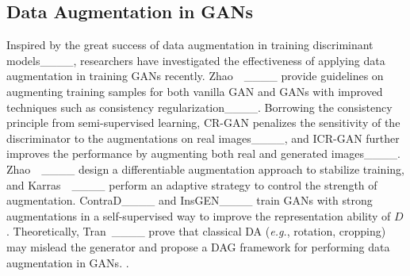 \subsection{Data Augmentation in GANs}
\label{Sec:RelatedDA}
Inspired by the great success of data augmentation in training discriminant models____, researchers have investigated the effectiveness of applying data augmentation in training GANs recently.
Zhao~\etal~____ provide guidelines on augmenting training samples for both vanilla GAN and GANs with improved techniques such as consistency regularization____.
Borrowing the consistency principle from semi-supervised learning, CR-GAN penalizes the sensitivity of the discriminator to the augmentations on real images____, and ICR-GAN further improves the performance by augmenting both real and generated images____.
Zhao~\etal~____ design a differentiable augmentation approach to stabilize training, and Karras~\etal~____ perform an adaptive strategy to control the strength of augmentation.
ContraD____ and InsGEN____ train GANs with strong augmentations in a self-supervised way to improve the representation ability of $D$.
Theoretically, Tran~\etal____ prove that classical DA (\emph{e.g.}, rotation, cropping) may mislead the generator and propose a DAG framework for performing data augmentation in GANs.
.